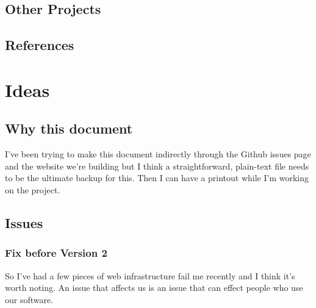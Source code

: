 \documentclass[a4paper, 11pt]{report}
\begin{document}
\hypertarget{other-projects}{%
\subsection{Other Projects}\label{other-projects}}

\hypertarget{references}{%
\subsection{References}\label{references}}

\hypertarget{ideas}{%
\section{Ideas}\label{ideas}}

\hypertarget{why-this-document}{%
\subsection{Why this document}\label{why-this-document}}

I've been trying to make this document indirectly through the Github
issues page and the website we're building but I think a
straightforward, plain-text file needs to be the ultimate backup for
this. Then I can have a printout while I'm working on the project.

\hypertarget{issues}{%
\subsection{Issues}\label{issues}}

\hypertarget{fix-before-version-2}{%
\subsubsection{Fix before Version 2}\label{fix-before-version-2}}

So I've had a few pieces of web infrastructure fail me recently and I
think it's worth noting. An issue that affects us is an issue that can
effect people who use our software.
\end{document}
